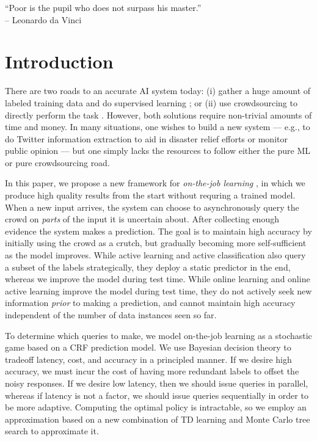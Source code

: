 \begin{epigraph}
``Poor is the pupil who does not surpass his master.''\\
-- Leonardo da Vinci
\end{epigraph}


\section{Introduction}
\label{sec:intro}

There are two roads to an accurate AI system today:
(i) gather a huge amount of labeled training data \citep{deng2009imagenet} and do supervised learning \citep{krizhevsky2012imagenet};
or (ii) use crowdsourcing to directly perform the task \citep{bernstein2010soylent,kokkalis2013emailvalet}.
However, both solutions require non-trivial amounts of time and money.
In many situations, one wishes to build a new system --- e.g., to do Twitter information extraction
\citep{li2012twiner} to aid in disaster relief efforts or monitor public
opinion --- but one simply lacks the resources to follow either the pure ML or pure crowdsourcing road.

In this paper, we propose a new framework for \emph{on-the-job learning} \citep{lasecki2013real},
in which we produce high quality results from the start without requring a trained model.
When a new input arrives,
the system can choose to asynchronously query the crowd on \emph{parts} of the input it is
uncertain about. After collecting enough evidence the system makes a prediction.
The goal is to maintain high accuracy by initially using the crowd as a crutch,
but gradually becoming more self-sufficient as the model improves.
While active learning \citep{settles2010active} and active classification \citep{gao2011active}
also query a subset of the labels strategically,
they deploy a static predictor in the end,
whereas we improve the model during test time.
While online learning \citep{cesabianchi06prediction} and
online active learning \citep{helmbold1997some,sculley2007online,chu2011unbiased}
improve the model during test time,
they do not actively seek new information \emph{prior} to making a prediction,
and cannot maintain high accuracy independent of the number of data instances seen so far.

To determine which queries to make,
we model on-the-job learning as a stochastic game based on a CRF prediction model.
We use Bayesian decision theory to tradeoff latency, cost, and accuracy in a principled manner.
If we desire high accuracy, we must incur the cost of having more redundant labels
to offset the noisy responses.  If we desire low latency, then we should issue queries
in parallel, whereas if latency is not a factor, we should issue queries
sequentially in order to be more adaptive.
Computing the optimal policy is intractable,
so we employ an approximation
based on a new combination of TD learning \citep{sutton1988learning}
and Monte Carlo tree search \citep{kocsis2006bandit} to approximate it.

